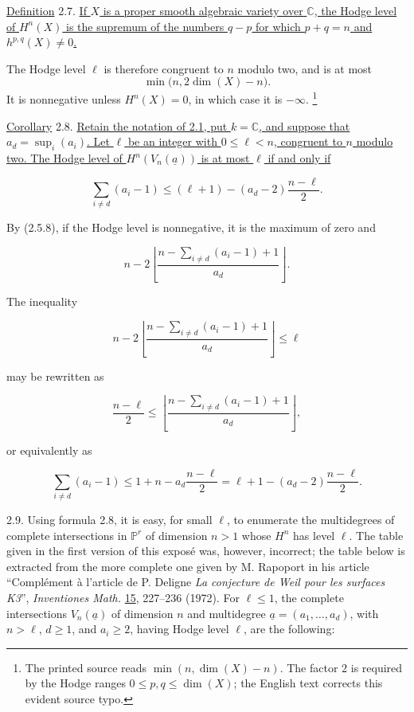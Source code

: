 \underline{Definition} 2.7. \underline{If $X$ is a proper smooth algebraic
variety over $\mathbb C$, the Hodge level of $H^n(X)$ is the supremum of
the numbers $q-p$ for which $p+q=n$ and $h^{p,q}(X)\ne0$.}

The Hodge level $\ell$ is therefore congruent to $n$ modulo two, and is at
most
\[
\min\bigl(n,2\dim(X)-n\bigr).
\]
It is nonnegative unless $H^n(X)=0$, in which case it is $-\infty$.
\footnote{The printed source reads
$\min(n,\dim(X)-n)$.  The factor $2$ is required by the Hodge ranges
$0\leq p,q\leq\dim(X)$; the English text corrects this evident source
typo.}

\underline{Corollary} 2.8. \underline{Retain the notation of 2.1, put
$k=\mathbb C$, and suppose that $a_d=\sup_i(a_i)$.  Let $\ell$ be an
integer with $0\leq\ell<n$, congruent to $n$ modulo two.  The Hodge level
of $H^n(V_n(\underline a))$ is at most $\ell$ if and only if}


\begin{equation*}
\sum_{i\ne d}(a_i-1)
\leq (\ell+1)-(a_d-2)\frac{n-\ell}{2}.
\end{equation*}

By (2.5.8), if the Hodge level is nonnegative, it is the maximum of zero
and

\begin{equation*}
n-2\left\lfloor
\frac{n-\sum_{i\ne d}(a_i-1)+1}{a_d}
\right\rfloor.
\end{equation*}

The inequality

\begin{equation*}
n-2\left\lfloor
\frac{n-\sum_{i\ne d}(a_i-1)+1}{a_d}
\right\rfloor\leq\ell
\end{equation*}

may be rewritten as

\begin{equation*}
\frac{n-\ell}{2}
\leq
\left\lfloor
\frac{n-\sum_{i\ne d}(a_i-1)+1}{a_d}
\right\rfloor,
\end{equation*}

or equivalently as

\begin{equation*}
\sum_{i\ne d}(a_i-1)
\leq 1+n-a_d\frac{n-\ell}{2}
=\ell+1-(a_d-2)\frac{n-\ell}{2}.
\end{equation*}

2.9. Using formula 2.8, it is easy, for small $\ell$, to enumerate the
multidegrees of complete intersections in $\mathbb P^r$ of dimension
$n>1$ whose $H^n$ has level $\ell$.  The table given in the first version
of this exposé was, however, incorrect; the table below is extracted from
the more complete one given by M. Rapoport in his article
``Complément à l'article de P. Deligne \emph{La conjecture de Weil pour
les surfaces K3}'', \emph{Inventiones Math.} \underline{15}, 227--236
(1972).  For $\ell\leq1$, the complete intersections
$V_n(\underline a)$ of dimension $n$ and multidegree
$\underline a=(a_1,\ldots,a_d)$, with $n>\ell$, $d\geq1$, and $a_i\geq2$,
having Hodge level $\ell$, are the following:

